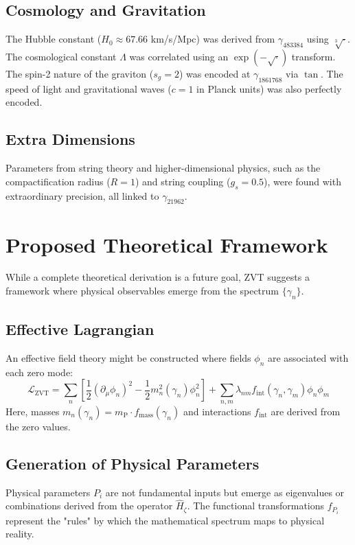\documentclass[12pt, twocolumn, reprint, amsmath, amssymb, aps]{revtex4-2}
\newcommand{\riemannzeros}{\{\gamma_n\}}
\newcommand{\hamiltonian}{\hat{H}_{\zeta}}
\newcommand{\planckmass}{m_{\text{P}}}
\begin{document}
\subsection{Cosmology and Gravitation}
\label{sec:cosmo_grav}
The Hubble constant ($H_0 \approx 67.66$ km/s/Mpc) was derived from $\gamma_{483384}$ using $\sqrt[3]{\cdot}$. The cosmological constant $\Lambda$ was correlated using an $\exp(-\sqrt{\cdot})$ transform. The spin-2 nature of the graviton ($s_g=2$) was encoded at $\gamma_{1861768}$ via $\tan$. The speed of light and gravitational waves ($c=1$ in Planck units) was also perfectly encoded.

\subsection{Extra Dimensions}
\label{sec:extra_dim}
Parameters from string theory and higher-dimensional physics, such as the compactification radius ($R=1$) and string coupling ($g_s=0.5$), were found with extraordinary precision, all linked to $\gamma_{21962}$.

\section{Proposed Theoretical Framework}
\label{sec:framework}
While a complete theoretical derivation is a future goal, ZVT suggests a framework where physical observables emerge from the spectrum $\riemannzeros$.

\subsection{Effective Lagrangian}
\label{sec:lagrangian}
An effective field theory might be constructed where fields $\phi_n$ are associated with each zero mode:
\begin{equation}
\mathcal{L}_{\text{ZVT}} = \sum_n \left[ \frac{1}{2}(\partial_\mu \phi_n)^2 - \frac{1}{2}m_n^2(\gamma_n)\phi_n^2 \right] + \sum_{n,m} \lambda_{nm} f_{\text{int}}(\gamma_n, \gamma_m) \phi_n \phi_m
\end{equation}
Here, masses $m_n(\gamma_n) = \planckmass \cdot f_{\text{mass}}(\gamma_n)$ and interactions $f_{\text{int}}$ are derived from the zero values.

\subsection{Generation of Physical Parameters}
\label{sec:generation}
Physical parameters $P_i$ are not fundamental inputs but emerge as eigenvalues or combinations derived from the operator $\hamiltonian$. The functional transformations $f_{P_i}$ represent the "rules" by which the mathematical spectrum maps to physical reality.
\end{document}
